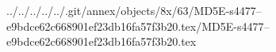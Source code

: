 ../../../../../.git/annex/objects/8x/63/MD5E-s4477--e9bdce62c668901ef23db16fa57f3b20.tex/MD5E-s4477--e9bdce62c668901ef23db16fa57f3b20.tex